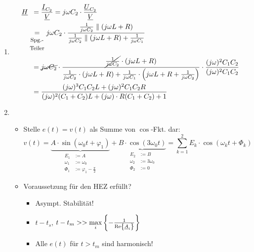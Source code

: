 \begin{enumerate}[label= \bfseries\alph*)]
  \item 
    \begin{align*}
      \underline{H} &\;\;= \frac{\underline{I}_{C_2}}{\underline{V}}
        = j\omega C_2\cdot\frac{\underline{U}_{C_2}}{\underline{V}}  \\
        &\underset{\begin{matrix}
            \text{\footnotesize Spg.-}\\
            \text{\footnotesize Teiler}
          \end{matrix}}{=}
          j\omega C_2\cdot\frac{\frac{1}{j\omega C_2}\parallel(j\omega L+R)}
          {\frac{1}{j\omega C_2}\parallel(j\omega L+R)+\frac{1}{j\omega C_1}}\\
        &\;\;= \cancel{j\omega C_2}
          \cdot\frac{\cancel{\frac{1}{j\omega C_2}}\cdot (j\omega L+R)}
            {\frac{1}{j\omega C_2} \cdot (j\omega L+R) + \frac{1}{j\omega C_1}
              \cdot\left(j\omega L+R+\frac{1}{j\omega C_2}\right)}
          \cdot\frac{(j\omega)^2C_1C_2}
            {(j\omega)^2C_1C_2} \\
        &\;\;=\frac{(j\omega)^3C_1C_2L+(j\omega)^2C_1C_2R}
          {(j\omega)^2(C_1+C_2)L+(j\omega)\cdot R(C_1+C_2)+1}
    \end{align*}

  \item
    \begin{itemize}
      \item Stelle $e(t) = v(t)$ als Summe von $\cos$-Fkt. dar:
        \[v(t) = \underbrace{A\cdot \sin(\omega_0 t+\varphi_1)}_{
            \begin{aligned}
              E_1       &:= A \\
              \omega_1  &:= \omega_0  \\
              \Phi_1    &:= \varphi_1-\frac\pi2
            \end{aligned}}
          +\underbrace{B\cdot \cos(3\omega_0 t)}_{
            \begin{aligned}
              E_2       &:= B \\
              \omega_2  &:= 3\omega_0 \\
              \Phi_2    &:= 0
            \end{aligned}}
          =\sum_{k=1}^{2} E_k\cdot \cos(\omega_k t+\Phi_k)\]
      \item Voraussetzung für den HEZ erfüllt?
      
        \begin{itemize}[label=$\rightarrow$]
          \item Asympt. Stabilität!
          \item $t-t_s$, $t-t_m >> \underset{i}{\operatorname{max}}
            \left\{-\frac{1}{\operatorname{Re}\left\{\underline{A}_i\right\}}\right\}$
          \item Alle $e(t)$ für $t>t_m$ sind harmonisch!
        \end{itemize}
        

\end{itemize}
\end{enumerate}

